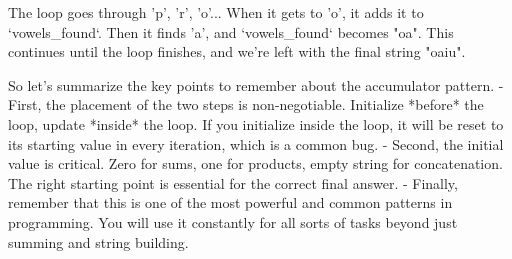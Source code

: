 \documentclass{beamer}
\begin{document}
\begin{frame}[fragile]
\begin{note}
    The loop goes through 'p', 'r', 'o'... When it gets to 'o', it adds it to `vowels_found`. Then it finds 'a', and `vowels_found` becomes "oa". This continues until the loop finishes, and we're left with the final string "oaiu".
    
    So let's summarize the key points to remember about the accumulator pattern.
    - First, the placement of the two steps is non-negotiable. Initialize *before* the loop, update *inside* the loop. If you initialize inside the loop, it will be reset to its starting value in every iteration, which is a common bug.
    - Second, the initial value is critical. Zero for sums, one for products, empty string for concatenation. The right starting point is essential for the correct final answer.
    - Finally, remember that this is one of the most powerful and common patterns in programming. You will use it constantly for all sorts of tasks beyond just summing and string building.
    \end{note}
\end{frame}
\end{document}
